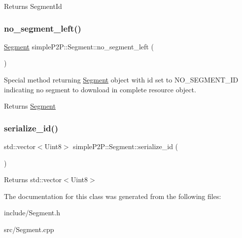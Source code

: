 \begin{DoxyReturn}{Returns}
Segment\+Id 
\end{DoxyReturn}
\mbox{\label{classsimpleP2P_1_1Segment_a56647eb9ebec99422adec7934833eb18}} 
\subsubsection{\texorpdfstring{no\+\_\+segment\+\_\+left()}{no\_segment\_left()}}
{\footnotesize\ttfamily \hyperlink{classsimpleP2P_1_1Segment}{Segment} simple\+P2\+P\+::\+Segment\+::no\+\_\+segment\+\_\+left (\begin{DoxyParamCaption}{ }\end{DoxyParamCaption})\hspace{0.3cm}{\ttfamily [static]}}



Special method returning \hyperlink{classsimpleP2P_1_1Segment}{Segment} object with id set to N\+O\+\_\+\+S\+E\+G\+M\+E\+N\+T\+\_\+\+ID indicating no segment to download in complete resource object. 

\begin{DoxyReturn}{Returns}
\hyperlink{classsimpleP2P_1_1Segment}{Segment} 
\end{DoxyReturn}
\mbox{\label{classsimpleP2P_1_1Segment_a2a153d1483576cdec85e0bbfe10e11b5}} 
\subsubsection{\texorpdfstring{serialize\+\_\+id()}{serialize\_id()}}
{\footnotesize\ttfamily std\+::vector$<$Uint8$>$ simple\+P2\+P\+::\+Segment\+::serialize\+\_\+id (\begin{DoxyParamCaption}{ }\end{DoxyParamCaption})}

\begin{DoxyReturn}{Returns}
std\+::vector$<$\+Uint8$>$ 
\end{DoxyReturn}


The documentation for this class was generated from the following files\+:\begin{DoxyCompactItemize}
\item 
include/Segment.\+h\item 
src/Segment.\+cpp\end{DoxyCompactItemize}
